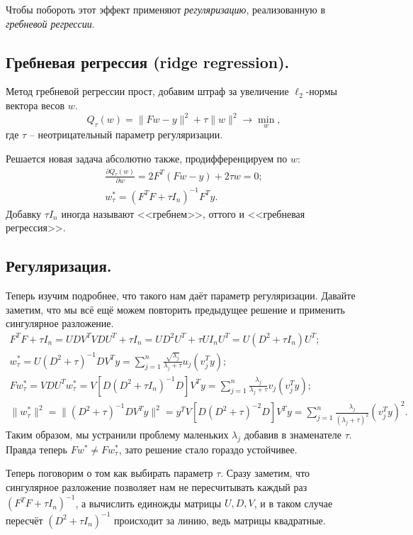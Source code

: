 Чтобы побороть этот эффект применяют \textit{регуляризацию}, реализованную в \textit{гребневой регрессии}.

\subsection*{Гребневая регрессия (ridge regression).}
Метод гребневой регрессии прост, добавим штраф за увеличение $\ell_2$-нормы вектора весов $w$.
$$Q_\tau(w) = \|Fw - y\|^2 + \tau \|w\|^2 \to \min_w,$$
где $\tau$ -- неотрицательный параметр регуляризации.

Решается новая задача абсолютно также, продифференцируем по $w$:
\begin{gather*}
    \frac{\partial Q_\tau(w)}{\partial w} = 2 F^T (Fw - y) + 2\tau w = 0; \\
    w_\tau^* = (F^TF + \tau I_n)^{-1} F^Ty.
\end{gather*}
Добавку $\tau I_n$ иногда называют <<гребнем>>, оттого и <<гребневая регрессия>>.

\subsection*{Регуляризация.}
Теперь изучим подробнее, что такого нам даёт параметр регуляризации.
Давайте заметим, что мы всё ещё можем повторить предыдущее решение и применить сингулярное разложение.
\begin{gather*}
    F^TF + \tau I_n = UDV^TVDU^T + \tau I_n = UD^2U^T + \tau UI_nU^T = U(D^2 + \tau I_n)U^T; \\
    w_\tau^* = U(D^2 + \tau)^{-1}DV^Ty = \sum_{j=1}^n \frac{\sqrt{\lambda_j}}{\lambda_j + \tau}u_j(v_j^Ty); \\
    Fw_\tau^* = VDU^Tw_\tau^* = V\left[D(D^2 + \tau I_n)^{-1}D\right]V^Ty = \sum_{j=1}^n \frac{\lambda_j}{\lambda_j + \tau} v_j(v_j^Ty); \\
    \|w_\tau^*\|^2 = \|(D^2 + \tau)^{-1}DV^Ty\|^2 = y^TV\left[D(D^2 + \tau)^{-2}D\right]V^Ty = \sum_{j=1}^n \frac{\lambda_j}{(\lambda_j + \tau)^2}(v_j^Ty)^2.
\end{gather*}
Таким образом, мы устранили проблему маленьких $\lambda_j$ добавив в знаменателе $\tau$. Правда теперь $Fw^* \not= Fw_\tau^*$, зато решение стало гораздо устойчивее.

Теперь поговорим о том как выбирать параметр $\tau$. Сразу заметим, что сингулярное разложение позволяет нам не пересчитывать каждый раз $(F^TF + \tau I_n)^{-1}$, а вычислить единожды матрицы $U, D, V$, и в таком случае пересчёт $(D^2 + \tau I_n)^{-1}$ происходит за линию, ведь матрицы квадратные.

